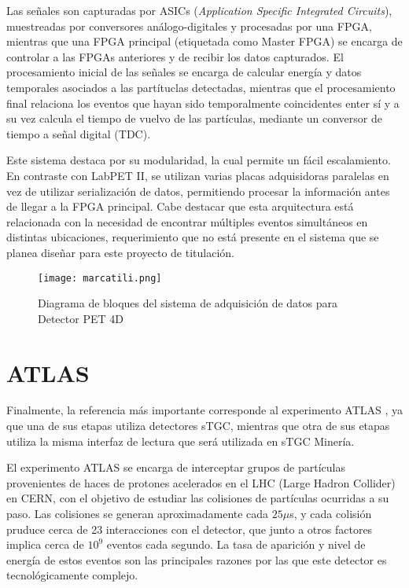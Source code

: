 	Las señales son capturadas por ASICs (\textit{Application Specific Integrated Circuits}), muestreadas por conversores análogo-digitales y procesadas por una FPGA, mientras que una FPGA principal (etiquetada como Master FPGA) se encarga de controlar a las FPGAs anteriores y de recibir los datos capturados. El procesamiento inicial de las señales se encarga de calcular energía y datos temporales asociados a las partítuclas detectadas, mientras que el procesamiento final relaciona los eventos que hayan sido temporalmente coincidentes enter sí y a su vez calcula el tiempo de vuelvo de las partículas, mediante un conversor de tiempo a señal digital (TDC).
	       	
	Este sistema destaca por su modularidad, la cual permite un fácil escalamiento. En contraste con LabPET II, se utilizan varias placas adquisidoras paralelas en vez de utilizar serialización de datos, permitiendo procesar la información antes de llegar a la FPGA principal. Cabe destacar que esta arquitectura está relacionada con la necesidad de encontrar múltiples eventos simultáneos en distintas ubicaciones, requerimiento que no está presente en el sistema que se planea diseñar para este proyecto de titulación. 
	
	\begin{figure}[h]
		\centering
		\texttt{[image: marcatili.png]}
		\caption{Diagrama de bloques del sistema de adquisición de datos para Detector PET 4D \cite{Marcatili2011DevelopmentDetector}}
		\label{fig:marcatili}
	\end{figure}
	
\newpage
\section{ATLAS}
	Finalmente, la referencia más importante corresponde al experimento ATLAS \cite{Spieler2012ElectronicsAcquisition}, ya que una de sus etapas utiliza detectores sTGC, mientras que otra de sus etapas utiliza la misma interfaz de lectura que será utilizada en sTGC Minería.

	El experimento ATLAS se encarga de interceptar grupos de partículas provenientes de haces de protones acelerados en el LHC (Large Hadron Collider) en CERN, con el objetivo de estudiar las colisiones de partículas ocurridas a su paso. Las colisiones se generan aproximadamente cada $25\mu$s\cite{Whiteson2016TheSystem}, y cada colisión pruduce cerca de 23 interacciones con el detector, que junto a otros factores implica cerca de $10^9$ eventos cada segundo. La tasa de aparición y nivel de energía de estos eventos son las principales razones por las que este detector es tecnológicamente complejo.
	
